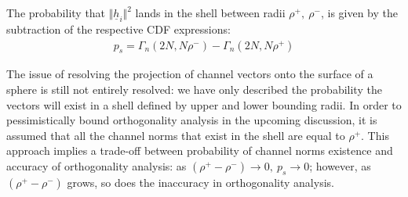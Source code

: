 The probability that $\Vert\underline{h}_i\Vert^2$ lands in the shell between radii $\rho^+,\ \rho^-$,  is given by the subtraction of the respective CDF expressions:
\begin{equation}\label{eq:p_s}
    \begin{aligned}
        p_s = \Gamma_n(2N,N\rho^-) - \Gamma_n(2N,N\rho^+)
    \end{aligned}
\end{equation}

The issue of resolving the projection of channel vectors onto the surface of a sphere is still not entirely resolved: we have only described the probability the vectors will exist in a shell defined by upper and lower bounding radii. In order to pessimistically bound orthogonality analysis in the upcoming discussion, it is assumed that all the channel norms that exist in the shell are equal to $\rho^+$. This approach implies a trade-off between probability of channel norms existence and accuracy of orthogonality analysis: as ${(\rho^+-\rho^-)\rightarrow 0},\ p_s\rightarrow 0$; however, as  $(\rho^+-\rho^-)$ grows, so does the inaccuracy in orthogonality analysis.


